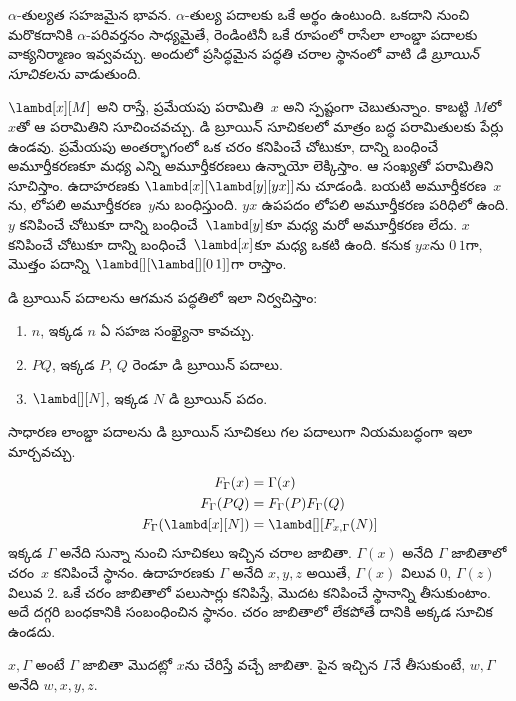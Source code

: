 \documentclass[../../../include/open-logic-section]{subfiles}
\begin{document}


$\alpha$-తుల్యత సహజమైన భావన. $\alpha$-తుల్య పదాలకు ఒకే అర్థం ఉంటుంది.
ఒకదాని నుంచి మరొకదానికి $\alpha$-పరివర్తనం సాధ్యమైతే, రెండింటినీ
ఒకే రూపంలో రాసేలా లాంబ్డా పదాలకు వాక్యనిర్మాణం ఇవ్వవచ్చు. అందులో ప్రసిద్ధమైన పద్ధతి చరాల స్థానంలో వాటి
\emph{డి బ్రూయిన్ సూచికలను} వాడుతుంది.

$\lambd[x][M]$ అని రాస్తే, ప్రమేయపు పరామితి~$x$ అని స్పష్టంగా
చెబుతున్నాం. కాబట్టి $M$లో $x$తో ఆ పరామితిని సూచించవచ్చు.
డి బ్రూయిన్ సూచికలలో మాత్రం బద్ధ పరామితులకు పేర్లు ఉండవు.
ప్రమేయపు అంతర్భాగంలో ఒక చరం కనిపించే చోటుకూ, దాన్ని బంధించే
అమూర్తీకరణకూ మధ్య ఎన్ని అమూర్తీకరణలు ఉన్నాయో లెక్కిస్తాం.
ఆ సంఖ్యతో పరామితిని సూచిస్తాం.
ఉదాహరణకు $\lambd[x][\lambd[y][y x]]$ను చూడండి. బయటి
అమూర్తీకరణ~$x$ను, లోపలి అమూర్తీకరణ~$y$ను బంధిస్తుంది.
$y x$ ఉపపదం లోపలి అమూర్తీకరణ పరిధిలో ఉంది. $y$ కనిపించే చోటుకూ
దాన్ని బంధించే~$\lambd[y]$కూ మధ్య మరో అమూర్తీకరణ లేదు. $x$ కనిపించే
చోటుకూ దాన్ని బంధించే~$\lambd[x]$కూ మధ్య ఒకటి ఉంది. కనుక
$y x$ను $0\, 1$గా, మొత్తం పదాన్ని
$\lambd[][\lambd[][0\,1]]$గా రాస్తాం.

\begin{defn}
  డి బ్రూయిన్ పదాలను ఆగమన పద్ధతిలో ఇలా నిర్వచిస్తాం:
  \begin{enumerate}
  \item $n$, ఇక్కడ $n$ ఏ సహజ సంఖ్యైనా కావచ్చు.
  \item $PQ$, ఇక్కడ $P$, $Q$ రెండూ డి బ్రూయిన్ పదాలు.
  \item $\lambd[][N]$, ఇక్కడ $N$ డి బ్రూయిన్ పదం.
  \end{enumerate}
\end{defn}

సాధారణ లాంబ్డా పదాలను డి బ్రూయిన్ సూచికలు గల పదాలుగా
నియమబద్ధంగా ఇలా మార్చవచ్చు.
\begin{defn}
  \begin{align*}
    F_\Gamma(x) &= \Gamma(x) \\
    F_\Gamma(PQ) &= F_\Gamma(P)F_\Gamma(Q) \\
    F_\Gamma(\lambd[x][N]) &= \lambd[][F_{x,\Gamma}(N)]
  \end{align*}
  ఇక్కడ $\Gamma$ అనేది సున్నా నుంచి సూచికలు ఇచ్చిన చరాల జాబితా.
  $\Gamma(x)$ అనేది $\Gamma$ జాబితాలో చరం~$x$ కనిపించే స్థానం.
  ఉదాహరణకు $\Gamma$ అనేది $x,y,z$ అయితే,
  $\Gamma(x)$ విలువ $0$, $\Gamma(z)$ విలువ $2$.
  ఒకే చరం జాబితాలో పలుసార్లు కనిపిస్తే, మొదట కనిపించే స్థానాన్ని
  తీసుకుంటాం. అదే దగ్గరి బంధకానికి సంబంధించిన స్థానం.
  చరం జాబితాలో లేకపోతే దానికి అక్కడ సూచిక ఉండదు.

  $x,\Gamma$ అంటే $\Gamma$ జాబితా మొదట్లో $x$ను చేరిస్తే వచ్చే జాబితా.
  పైన ఇచ్చిన $\Gamma$నే తీసుకుంటే,
  $w,\Gamma$ అనేది $w,x,y,z$.
\end{defn}
\end{document}
